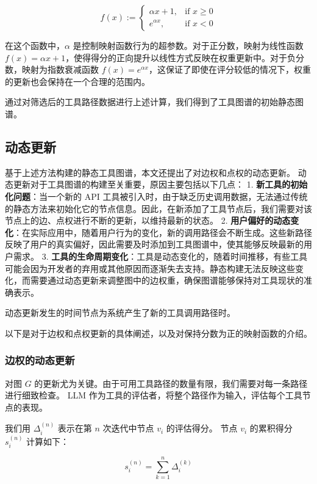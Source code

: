 \[
f(x) :=
\begin{cases}
\alpha x + 1, & \text{if } x \geq 0 \\
e^{\alpha x}, & \text{if } x < 0
\end{cases}
\]

在这个函数中，$\alpha$ 是控制映射函数行为的超参数。对于正分数，映射为线性函数 $f(x) = \alpha x + 1$，使得得分的正向提升以线性方式反映在权重更新中。对于负分数，映射为指数衰减函数 $f(x) = e^{\alpha x}$，这保证了即使在评分较低的情况下，权重的更新也会保持在一个合理的范围内。

通过对筛选后的工具路径数据进行上述计算，我们得到了工具图谱的初始静态图谱。

\subsection{动态更新}

基于上述方法构建的静态工具图谱，本文还提出了对边权和点权的动态更新。
动态更新对于工具图谱的构建至关重要，原因主要包括以下几点：
1. \textbf{新工具的初始化问题}：当一个新的 API 工具被引入时，由于缺乏历史调用数据，无法通过传统的静态方法来初始化它的节点信息。因此，在新添加了工具节点后，我们需要对该节点上的边、点权进行不断的更新，以维持最新的状态。
2. \textbf{用户偏好的动态变化}：在实际应用中，随着用户行为的变化，新的调用路径会不断生成。这些新路径反映了用户的真实偏好，因此需要及时添加到工具图谱中，使其能够反映最新的用户需求。
3. \textbf{工具的生命周期变化}：工具是动态变化的，随着时间推移，有些工具可能会因为开发者的弃用或其他原因而逐渐失去支持。静态构建无法反映这些变化，而需要通过动态更新来调整图中的边权重，确保图谱能够保持对工具现状的准确表示。

动态更新发生的时间节点为系统产生了新的工具调用路径时。

以下是对于边权和点权更新的具体阐述，以及对保持分数为正的映射函数的介绍。

\subsubsection{边权的动态更新}

对图 \( G \) 的更新尤为关键。由于可用工具路径的数量有限，我们需要对每一条路径进行细致检查。
LLM 作为工具的评估者，将整个路径作为输入，评估每个工具节点的表现。

我们用 \( \Delta_i^{(n)} \) 表示在第 \( n \) 次迭代中节点 \( v_i \) 的评估得分。
节点 \( v_i \) 的累积得分 \( s_i^{(n)} \) 计算如下：

\[
s_i^{(n)} = \sum_{k=1}^{n} \Delta_i^{(k)}
\]

